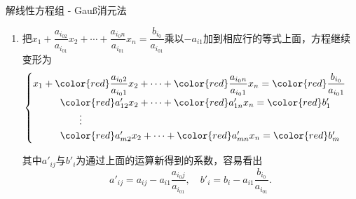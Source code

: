 
\begin{frame}{解线性方程组 - Gau{\ss}消元法}

\begin{enumerate}\addtocounter{enumi}{1}
\item 把$x_1 + \dfrac{a_{i_02}}{a_{i_01}}x_2 + \cdots + \dfrac{a_{i_0n}}{a_{i_01}}x_n = \dfrac{b_{i_0}}{a_{i_01}}$乘以$-a_{i1}$加到相应行的等式上面，方程继续变形为
$$
\begin{cases}
x_1 + {\color{red} \dfrac{a_{i_02}}{a_{i_01}}}x_2 + \cdots + {\color{red} \dfrac{a_{i_0n}}{a_{i_01}}}x_n = {\color{red} \dfrac{b_{i_0}}{a_{i_01}}} \\
\phantom{x_1 +a} {\color{red} a'_{12}}x_2 + \cdots + {\color{red} a'_{1n}}x_n = {\color{red} b'_1} \\
\phantom{yyyyyyyyy} \vdots \\
\phantom{x_1 +a} {\color{red} a'_{m2}}x_2 + \cdots + {\color{red} a'_{mn}}x_n = {\color{red} b'_m}
\end{cases}$$

\pause

其中$a'_{ij}$与$b'_i$为通过上面的运算新得到的系数，容易看出
$$a'_{ij} = a_{ij} - a_{i1}\dfrac{a_{i_0j}}{a_{i_01}}, \quad b'_{i} = b_{i} - a_{i1}\dfrac{b_{i_0}}{a_{i_01}}.$$
\end{enumerate}

\end{frame}


